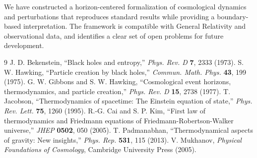 \documentclass[12pt,a4paper]{article}
\begin{document}
We have constructed a horizon-centered formalization of cosmological dynamics and perturbations that reproduces standard results while providing a boundary-based interpretation. The framework is compatible with General Relativity and observational data, and identifies a clear set of open problems for future development.

\begin{thebibliography}{9}
 J. D. Bekenstein, ``Black holes and entropy,'' \textit{Phys. Rev. D} \textbf{7}, 2333 (1973).
 S. W. Hawking, ``Particle creation by black holes,'' \textit{Commun. Math. Phys.} \textbf{43}, 199 (1975).
 G. W. Gibbons and S. W. Hawking, ``Cosmological event horizons, thermodynamics, and particle creation,'' \textit{Phys. Rev. D} \textbf{15}, 2738 (1977).
 T. Jacobson, ``Thermodynamics of spacetime: The Einstein equation of state,'' \textit{Phys. Rev. Lett.} \textbf{75}, 1260 (1995).
 R.-G. Cai and S. P. Kim, ``First law of thermodynamics and Friedmann equations of Friedmann-Robertson-Walker universe,'' \textit{JHEP} \textbf{0502}, 050 (2005).
 T. Padmanabhan, ``Thermodynamical aspects of gravity: New insights,'' \textit{Phys. Rep.} \textbf{531}, 115 (2013).
 V. Mukhanov, \textit{Physical Foundations of Cosmology}, Cambridge University Press (2005).
\end{thebibliography}
\end{document}
